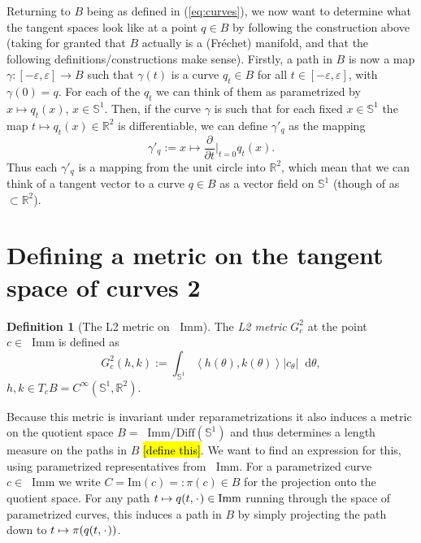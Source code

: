 \message{ !name(tangent_space_of_curves.tex)}\documentclass[a4,danish]{article}
\theoremstyle{break}
\theoremstyle{definition}
\newtheorem{definition}[subsection]{Definition}
\theoremstyle{Break}
\newcommand{\R}{\mathbb{R}}
\newcommand*\I{\mathop{}\!\mathrm{Imm}}
\renewcommand{\S}{\mathbb{S}}
\newcommand{\blank}{\makebox[1ex]{\textbf{$\cdot$}}}
\renewcommand{\epsilon}{\varepsilon}
\newcommand*\diff{\mathop{}\!\mathrm{d}}
\begin{document}
Returning to $B$ being as defined in (\ref{eq:curves}), we now
want to determine what the tangent spaces look like at a point $q \in B$ by
following the construction above (taking for
granted that $B$ actually is a (Fr\'echet) manifold, and
that the following definitions/constructions make sense). Firstly, a
path in $B$ is now a map $\gamma\colon [-\epsilon,\epsilon] \rightarrow B$ such that
$\gamma(t)$ is a curve $q_t \in B$ for all $t \in
[-\epsilon,\epsilon]$, with $\gamma(0) =q$. For each of the $q_t$ we
can think of them as parametrized by $x \mapsto q_t(x)$, $x \in
\S^1$. Then, if the curve $\gamma$ is such that for each fixed
$x \in \S^1 $ the map $t \mapsto q_{t}(x) \in \R^2$ is differentiable,
we can define $\gamma'_q$ as the mapping
\begin{equation*}
  \gamma'_q := x \mapsto \frac{\partial }{\partial t} \bigg\vert_{t=0}q_t(x).
\end{equation*}
Thus each $\gamma'_q$ is a mapping from the unit circle into $\R^2$,
which mean that we can think of a tangent vector to a curve $q \in B$
as a vector field on $\S^1$ (though of as $\subset \R^2$).






\section*{Defining a metric on the tangent space of curves 2}
\label{sec:defin-metr-tang-2}



\begin{definition}[The L2 metric on $\I$]
  The \textit{L2 metric} $G^2_c$ at the point $c \in \I$ is defined as
  \begin{equation*}
    G^2_c(h,k) := \int_{\S^{1}} \left\langle{h(\theta)
    , k(\theta)}\right\rangle |c_{\theta}| \diff \theta,
  \end{equation*}
  $h,k \in T_cB = C^{\infty}(\S^1,\R^2)$.
\end{definition}

Because this metric is invariant under reparametrizations it also induces a metric
on the quotient space $B = \I/\text{Diff}(\S^1)$ and thus 
determines a length measure on the paths in $B$
\hl{[define this]}. We want to find an expression for this, using
parametrized representatives from $\I$. For a parametrized curve $c
\in \I$ we write $C = \text{Im}(c) =: \pi(c) \in B$ for the projection
onto the quotient space. For any path $t \mapsto q(t, \blank) \in
\I$ running through the space of parametrized curves, this induces
a path in $B$ by simply projecting the path down to $t \mapsto \pi(q(t,
\blank))$. 
\end{document}
